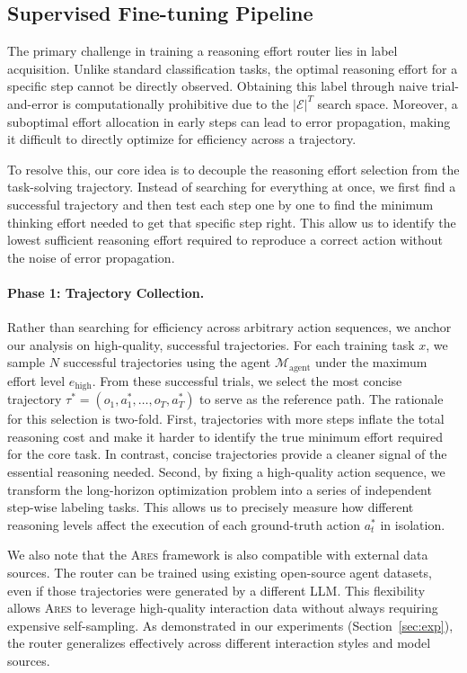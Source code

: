 \documentclass{article}
\newcommand{\ares}{\textsc{Ares}}
\theoremstyle{plain}
\theoremstyle{definition}
\theoremstyle{remark}
\begin{document}
\subsection{Supervised Fine-tuning Pipeline}
\label{sec:method}
The primary challenge in training a reasoning effort router lies in label acquisition. Unlike standard classification tasks, the optimal reasoning effort for a specific step cannot be directly observed. Obtaining this label through naive trial-and-error is computationally prohibitive due to the $|\mathcal{E}|^T$ search space. Moreover, a suboptimal effort allocation in early steps can lead to error propagation, making it difficult to directly optimize for efficiency across a trajectory.

To resolve this, our core idea is to decouple the reasoning effort selection from the task-solving trajectory. Instead of searching for everything at once, we first find a successful trajectory and then test each step one by one to find the minimum thinking effort needed to get that specific step right. This allow us to identify the lowest sufficient reasoning effort required to reproduce a correct action without the noise of error propagation.

\paragraph{Phase 1: Trajectory Collection.}

Rather than searching for efficiency across arbitrary action sequences, we anchor our analysis on high-quality, successful trajectories. For each training task $x$, we sample $N$ successful trajectories using the agent $\mathcal{M}_{\text{agent}}$ under the maximum effort level $e_{\text{high}}$. From these successful trials, we select the most concise trajectory $\tau^* = (o_1, a^*_1, \dots, o_T, a^*_T)$ to serve as the reference path. The rationale for this selection is two-fold. First, trajectories with more steps inflate the total reasoning cost and make it harder to identify the true minimum effort required for the core task. In contrast, concise trajectories provide a cleaner signal of the essential reasoning needed. Second, by fixing a high-quality action sequence, we transform the long-horizon optimization problem into a series of independent step-wise labeling tasks. This allows us to precisely measure how different reasoning levels affect the execution of each ground-truth action $a^*_t$ in isolation.

We also note that the {\ares} framework is also compatible with external data sources. The router can be trained using existing open-source agent datasets, even if those trajectories were generated by a different LLM. This flexibility allows {\ares} to leverage high-quality interaction data without always requiring expensive self-sampling. As demonstrated in our experiments (Section~\ref{sec:exp}), the router generalizes effectively across different interaction styles and model sources.
\end{document}
